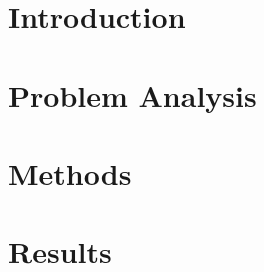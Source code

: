 \clearpage
			\tableofcontents
			\cleardoublepage


\fancyhf{}
\fancyfoot[C]{\thepage} %
\fancyhead[RE,LO]{}																												%
\fancyhead[RE,LO]{\color{aaublue}\small\nouppercase\leftmark} %
\pagestyle{fancy}



%
\chapter{Introduction} \label{chap:Introduction}



\chapter{Problem Analysis} \label{chap:PA}








%


\chapter{Methods} \label{chap:Methods}








\chapter{Results} \label{chap:Results}


